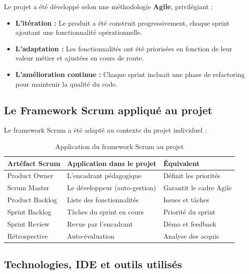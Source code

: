 \documentclass[12pt,a4paper,twoside]{report}
\begin{document}
Le projet a été développé selon une méthodologie \textbf{Agile}, privilégiant :

\begin{itemize}
    \item \textbf{L'itération :} Le produit a été construit progressivement, chaque sprint ajoutant une fonctionnalité opérationnelle.
    \item \textbf{L'adaptation :} Les fonctionnalités ont été priorisées en fonction de leur valeur métier et ajustées en cours de route.
    \item \textbf{L'amélioration continue :} Chaque sprint incluait une phase de refactoring pour maintenir la qualité du code.
\end{itemize}

\subsection{Le Framework Scrum appliqué au projet}

Le framework Scrum a été adapté au contexte du projet individuel :

\begin{table}[H]
    \centering
    \caption{Application du framework Scrum au projet}
    \label{tab:scrum}
    \begin{tabular}{lll}
        \toprule
        \textbf{Artéfact Scrum} & \textbf{Application dans le projet} & \textbf{Équivalent} \\
        \midrule
        Product Owner & L'encadrant pédagogique & Définit les priorités \\
        Scrum Master & Le développeur (auto-gestion) & Garantit le cadre Agile \\
        Product Backlog & Liste des fonctionnalités & Issues et tâches \\
        Sprint Backlog & Tâches du sprint en cours & Priorité du sprint \\
        Sprint Review & Revue par l'encadrant & Démo et feedback \\
        Rétrospective & Auto-évaluation & Analyse des acquis \\
        \bottomrule
    \end{tabular}
\end{table}

\subsection{Technologies, IDE et outils utilisés}
\end{document}
